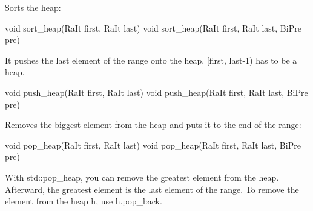 Sorts the heap:

\begin{cpp}
void sort_heap(RaIt first, RaIt last)
void sort_heap(RaIt first, RaIt last, BiPre pre)
\end{cpp}

It pushes the last element of the range onto the heap. [first, last-1) has to be a heap.

\begin{cpp}
void push_heap(RaIt first, RaIt last)
void push_heap(RaIt first, RaIt last, BiPre pre)
\end{cpp}

Removes the biggest element from the heap and puts it to the end of the range:

\begin{cpp}
void pop_heap(RaIt first, RaIt last)
void pop_heap(RaIt first, RaIt last, BiPre pre)
\end{cpp}

With std::pop\_heap, you can remove the greatest element from the heap. Afterward, the greatest element is the last element of the range. To remove the element from the heap h, use h.pop\_back.


